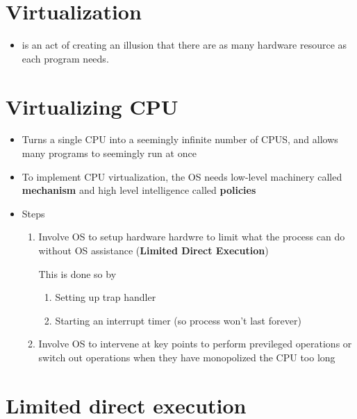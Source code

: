 \documentclass[12pt]{article}
\begin{document}
\section*{Virtualization}

\begin{itemize}
    \item is an act of creating an illusion that there are as many hardware resource as each program needs.
\end{itemize}

\section*{Virtualizing CPU}

\begin{itemize}
    \item Turns a single CPU into a seemingly infinite number of CPUS, and
    allows many programs to seemingly run at once
    \item To implement CPU virtualization, the OS needs low-level machinery
    called \textbf{mechanism} and high level intelligence called \textbf{policies}
    \item Steps

    \begin{enumerate}[1.]
        \item Involve OS to setup hardware hardwre to limit what the process can do without OS assistance
        (\textbf{Limited Direct Execution})

        \bigskip

        This is done so by

        \bigskip

        \begin{enumerate}[1.]
            \item Setting up trap handler
            \item Starting an interrupt timer (so process won't last forever)
        \end{enumerate}
        \item Involve OS to intervene at key points to perform previleged operations
        or switch out operations when they have monopolized the CPU too long
    \end{enumerate}
    \bigskip
\end{itemize}

\section*{Limited direct execution}
\end{document}
